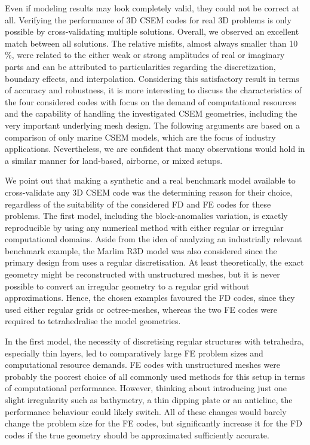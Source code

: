 \documentclass[
    paper,
  ]{geophysics}
\begin{document}
Even if modeling results may look completely valid, they could not be correct
at all. Verifying the performance of 3D CSEM codes for real 3D problems is only
possible by cross-validating multiple solutions. Overall, we observed an
excellent match between all solutions. The relative misfits, almost always
smaller than 10\,\%, were related to the either weak or strong amplitudes of
real or imaginary parts and can be attributed to particularities regarding the
discretization, boundary effects, and interpolation. Considering this
satisfactory result in terms of accuracy and robustness, it is more interesting
to discuss the characteristics of the four considered codes with focus on the
demand of computational resources and the capability of handling the
investigated CSEM geometries, including the very important underlying mesh
design. The following arguments are based on a comparison of only marine CSEM
models, which are the focus of industry applications. Nevertheless, we are
confident that many observations would hold in a similar manner for land-based,
airborne, or mixed setups.

We point out that making a synthetic and a real benchmark model available to
cross-validate any 3D CSEM code was the determining reason for their choice,
regardless of the suitability of the considered FD and FE codes for these
problems. The first model, including the block-anomalies variation, is exactly
reproducible by using any numerical method with either regular or irregular
computational domains. Aside from the idea of analyzing an industrially
relevant benchmark example, the Marlim R3D model was also considered since the
primary design from \cite{GEO.19.Correa} uses a regular discretisation. At
least theoretically, the exact geometry might be reconstructed with
unstructured meshes, but it is never possible to convert an irregular geometry
to a regular grid without approximations. Hence, the chosen examples favoured
the FD codes, since they used either regular grids or
octree-meshes, whereas the two FE codes were required to
tetrahedralise the model geometries.

In the first model, the necessity of discretising regular structures with
tetrahedra, especially thin layers, led to comparatively large FE problem sizes
and computational resource demands. FE codes with unstructured meshes were
probably the poorest choice of all commonly used methods for this setup in
terms of computational performance. However, thinking about introducing just
one slight irregularity such as bathymetry, a thin dipping plate or an
anticline, the performance behaviour could likely switch. All of these changes
would barely change the problem size for the FE codes, but significantly
increase it for the FD codes if the true geometry should be approximated
sufficiently accurate.
\end{document}
